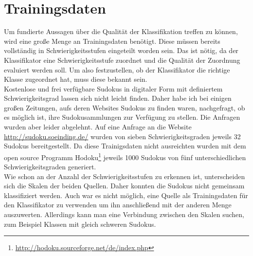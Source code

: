 \section{Trainingsdaten}
\label{Trainingsdaten}
Um fundierte Aussagen über die Qualität der Klassifikation treffen zu können, wird eine große Menge an Trainingsdaten benötigt. Diese müssen bereits vollständig in Schwierigkeitsstufen eingeteilt worden sein. Das ist nötig, da der Klassifikator eine Schwierigkeitsstufe zuordnet und die Qualität der Zuordnung evaluiert werden soll. Um also festzustellen, ob der Klassifikator die richtige Klasse zugeordnet hat, muss diese bekannt sein.\\
Kostenlose und frei verfügbare Sudokus in digitaler Form mit definiertem Schwierigkeitsgrad lassen sich nicht leicht finden. Daher habe ich bei einigen großen Zeitungen, aufs deren Websites Sudokus zu finden waren, nachgefragt, ob es möglich ist, ihre Sudokusammlungen zur Verfügung zu stellen. Die Anfragen wurden aber leider abgelehnt. Auf eine Anfrage an die Website \url{http://sudoku.soeinding.de/} wurden von sieben Schwierigkeitsgraden jeweils 32 Sudokus bereitgestellt. Da diese Trainigsdaten nicht ausreichten wurden mit dem open source Programm Hodoku\footnote{\url{http://hodoku.sourceforge.net/de/index.php}} jeweils 1000 Sudokus von fünf unterschiedlichen Schwierigkeitsgraden generiert.\\
Wie schon an der Anzahl der Schwierigkeitsstufen zu erkennen ist, unterscheiden sich die Skalen der beiden Quellen. Daher konnten die Sudokus nicht gemeinsam klassifiziert werden. Auch war es nicht möglich, eine Quelle als Trainingsdaten für den Klassifikator zu verwenden um ihn anschließend mit der anderen Menge auszuwerten. Allerdings kann man eine Verbindung zwischen den Skalen suchen, zum Beispiel Klassen mit gleich schweren Sudokus.